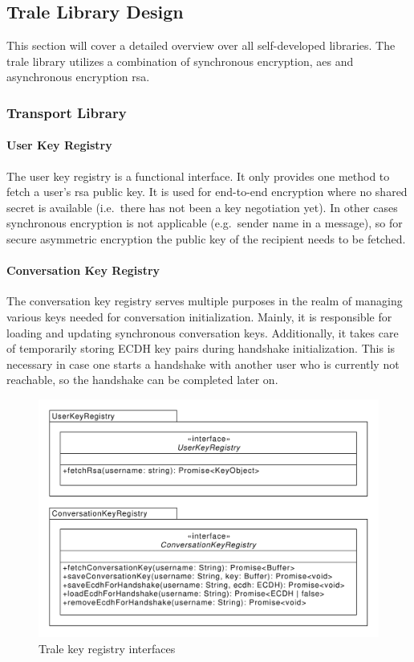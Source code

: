 \subsection{Trale Library Design}\label{subsec:trale-library-design}

This section will cover a detailed overview over all self-developed libraries.
The trale library utilizes a combination of synchronous encryption, \ac{aes} and asynchronous encryption \ac{rsa}.

\subsubsection{Transport Library}

\paragraph{User Key Registry}
The user key registry is a functional interface.
It only provides one method to fetch a user's \ac{rsa} public key.
It is used for end-to-end encryption where no shared secret is available (i.e.\ there has not been a key negotiation
yet).
In other cases synchronous encryption is not applicable (e.g.\ sender name in a message), so for secure asymmetric
encryption the public key of the recipient needs to be fetched.

\paragraph{Conversation Key Registry}
The conversation key registry serves multiple purposes in the realm of managing various keys needed for conversation
initialization.
Mainly, it is responsible for loading and updating synchronous conversation keys.
Additionally, it takes care of temporarily storing ECDH key pairs during handshake initialization.
This is necessary in case one starts a handshake with another user who is currently not reachable, so the handshake can
be completed later on.

\begin{figure}[H]
    \centering
    \includegraphics[width=1.0\textwidth]{./graphics/classDiagramTransportLibraryDiverse}
    \vspace*{-0.5cm}
    \caption{Trale key registry interfaces}
    \label{fig:figure34}
\end{figure}

